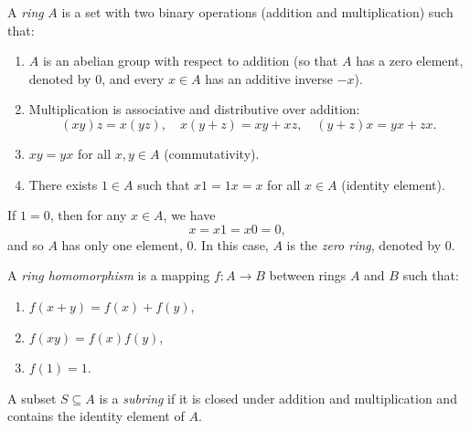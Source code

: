 \begin{definition}[Ring]
    A \emph{ring} \( A \) is a set with two binary operations (addition and multiplication) such that:
    \begin{enumerate}
        \item \( A \) is an abelian group with respect to addition (so that \( A \) has a zero element, denoted by \( 0 \), and every \( x \in A \) has an additive inverse \( -x \)).
        \item Multiplication is associative and distributive over addition:
        \[
        (xy)z = x(yz), \quad x(y + z) = xy + xz, \quad (y + z)x = yx + zx.
        \]
        \item \( xy = yx \) for all \( x, y \in A \) (commutativity).
        \item There exists \( 1 \in A \) such that \( x1 = 1x = x \) for all \( x \in A \) (identity element).
    \end{enumerate}
\end{definition}
    
\begin{remark}
If \( 1 = 0 \), then for any \( x \in A \), we have
\[
x = x1 = x0 = 0,
\]
and so \( A \) has only one element, \( 0 \). In this case, \( A \) is the \emph{zero ring}, denoted by \( 0 \).
\end{remark}
    
\begin{definition}
A \emph{ring homomorphism} is a mapping \( f: A \to B \) between rings \( A \) and \( B \) such that:
\begin{enumerate}
    \item \( f(x + y) = f(x) + f(y) \),
    \item \( f(xy) = f(x)f(y) \),
    \item \( f(1) = 1 \).
\end{enumerate}
\end{definition}

\begin{definition}[Subring] A subset \( S \subseteq A \) is a
\emph{subring} if it is closed under addition and multiplication and
contains the identity element of \( A \). \end{definition}
    

